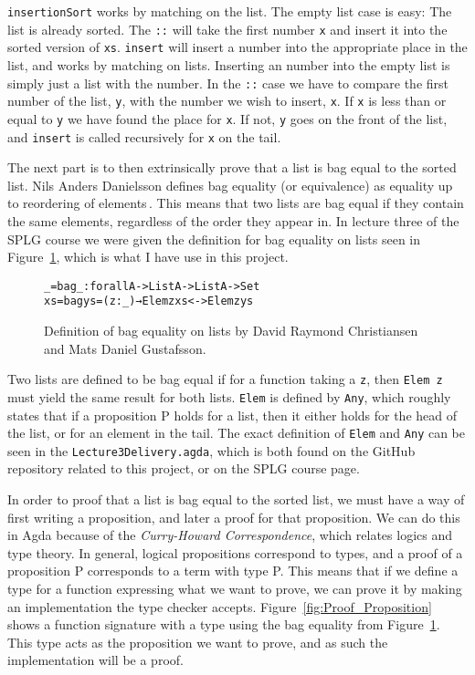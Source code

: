 \documentclass[oribibl, fleqn]{llncs}
\begin{document}
\texttt{insertionSort} works by matching on the list. The empty list case is easy: The list is already sorted. The \texttt{::} will take the first number \texttt{x} and insert it into the sorted version of \texttt{xs}. \texttt{insert} will insert a number into the appropriate place in the list, and works by matching on lists. Inserting an number into the empty list is simply just a list with the number. In the \texttt{::} case we have to compare the first number of the list, \texttt{y}, with the number we wish to insert, \texttt{x}. If \texttt{x} is less than or equal to \texttt{y} we have found the place for \texttt{x}. If not, \texttt{y} goes on the front of the list, and \texttt{insert} is called recursively for \texttt{x} on the tail.

The next part is to then extrinsically prove that a list is bag equal to the sorted list. Nils Anders Danielsson defines bag equality (or equivalence) as equality up to reordering of elements\,\cite{DBLP:conf/itp/Danielsson12}. This means that two lists are bag equal if they contain the same elements, regardless of the order they appear in. In lecture three of the SPLG course we were given the definition for bag equality on lists seen in Figure~\ref{fig:bag_eq}, which is what I have use in this project.

\begin{figure}
\begin{alltt}
_=bag_ : forall {A} -> List A -> List A -> Set
xs =bag ys = (z : _) → Elem z xs <-> Elem z ys
\end{alltt}
\caption{Definition of bag equality on lists by David Raymond Christiansen and Mats Daniel Gustafsson.}
\label{fig:bag_eq}
\end{figure}

Two lists are defined to be bag equal if for a function taking a \texttt{z}, then \texttt{Elem z} must yield the same result for both lists. \texttt{Elem} is defined by \texttt{Any}, which roughly states that if a proposition P holds for a list, then it either holds for the head of the list, or for an element in the tail. The exact definition of \texttt{Elem} and \texttt{Any} can be seen in the \texttt{Lecture3Delivery.agda}, which is both found on the GitHub repository related to this project, or on the SPLG course page.

In order to proof that a list is bag equal to the sorted list, we must have a way of first writing a proposition, and later a proof for that proposition. We can do this in Agda because of the \emph{Curry-Howard Correspondence}\cite[p. 108]{Pierce:TypeSystems}, which relates logics and type theory. In general, logical propositions correspond to types, and a proof of a proposition P corresponds to a term with type P. This means that if we define a type for a function expressing what we want to prove, we can prove it by making an implementation the type checker accepts. Figure~\ref{fig:Proof_Proposition} shows a function signature with a type using the bag equality from Figure~\ref{fig:bag_eq}. This type acts as the proposition we want to prove, and as such the implementation will be a proof.
\end{document}
